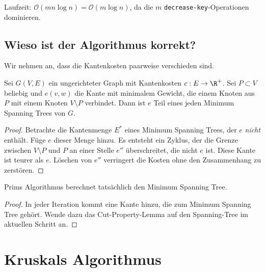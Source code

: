 \documentclass{mycourse}
\renewcommand{\O}{\mathcal{O}}
\begin{document}
Laufzeit: $\O(mn \log n) = \O(m\log n)$, da die $m$ \texttt{decrease-key}-Operationen dominieren.

\subsection{Wieso ist der Algorithmus korrekt?}

Wir nehmen an, dass die Kantenkosten paarweise verschieden sind.

\begin{lem}
	Sei $G(V,E)$ ein ungerichteter Graph mit Kantenkosten $c:E\to \R^+$.
	Sei $P\subset V$ beliebig und $e(v,w)$ die Kante mit minimalem Gewicht, die einem Knoten aus $P$ mit einem Knoten $V\setminus P$ verbindet.
	Dann ist $e$ Teil eines jeden Minimum Spanning Trees von $G$.
	\begin{proof}
		Betrachte die Kantenmenge $E^*$ eines Minimum Spanning Trees, der $e$ \emph{nicht} enthält.
		Füge $e$ dieser Menge hinzu.
		Es entsteht ein Zyklus, der die Grenze zwischen $V\setminus P$ und $P$ an einer Stelle $e''$ überschreitet, die nicht $e$ ist.
		Diese Kante ist teurer als $e$.
		Löschen von $e''$ verringert die Kosten ohne den Zusammenhang zu zerstören.
	\end{proof}
\end{lem}

\begin{kor}
	Prims Algorithmus berechnet tatsächlich den Minimum Spanning Tree.
	\begin{proof}
		In jeder Iteration kommt eine Kante hinzu, die zum Minimum Spanning Tree gehört.
		Wende dazu das Cut-Property-Lemma auf den Spanning-Tree im aktuellen Schritt an.
	\end{proof}
\end{kor}


\section{Kruskals Algorithmus}
\end{document}
